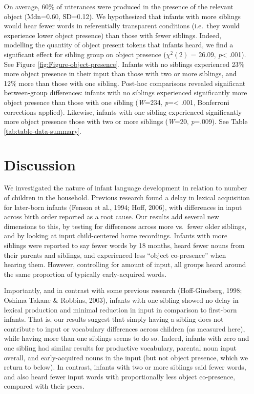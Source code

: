 \documentclass[
  english,
  man,floatsintext]{apa6}
\begin{document}
On average, 60\% of utterances were produced in the presence of the relevant object (Mdn=0.60, SD=0.12). We hypothesized that infants with more siblings would hear fewer words in referentially transparent conditions (i.e.~they would experience lower object presence) than those with fewer siblings. Indeed, modelling the quantity of object present tokens that infants heard, we find a significant effect for sibling group on object presence (\(\chi^2 (2)\) = 26.09, \emph{p}\textless{} .001). See Figure \ref{fig:Figure-object-presence}. Infants with no siblings experienced 23\% more object presence in their input than those with two or more siblings, and 12\% more than those with one sibling. Post-hoc comparisons revealed significant between-group differences: infants with no siblings experienced significantly more object presence than those with one sibling (\emph{W}=234, \emph{p}=\textless{} .001, Bonferroni corrections applied). Likewise, infants with one sibling experienced significantly more object presence those with two or more siblings (\emph{W}=20, \emph{p}=.009). See Table \ref{tab:table-data-summary}.

\hypertarget{discussion}{%
\section{Discussion}\label{discussion}}

We investigated the nature of infant language development in relation to number of children in the household. Previous research found a delay in lexical acquisition for later-born infants (Fenson et al., 1994; Hoff, 2006), with differences in input across birth order reported as a root cause. Our results add several new dimensions to this, by testing for differences across more vs.~fewer older siblings, and by looking at input child-centered home recordings. Infants with more siblings were reported to say fewer words by 18 months, heard fewer nouns from their parents and siblings, and experienced less \enquote{object co-presence} when hearing them. However, controlling for amount of input, all groups heard around the same proportion of typically early-acquired words.

Importantly, and in contrast with some previous research (Hoff-Ginsberg, 1998; Oshima-Takane \& Robbins, 2003), infants with one sibling showed no delay in lexical production and minimal reduction in input in comparison to first-born infants. That is, our results suggest that simply having a sibling does not contribute to input or vocabulary differences across children (as measured here), while having more than one siblings seems to do so. Indeed, infants with zero and one sibling had similar results for productive vocabulary, parental noun input overall, and early-acquired nouns in the input (but not object presence, which we return to below). In contrast, infants with two or more siblings said fewer words, and also heard fewer input words with proportionally less object co-presence, compared with their peers.
\end{document}
